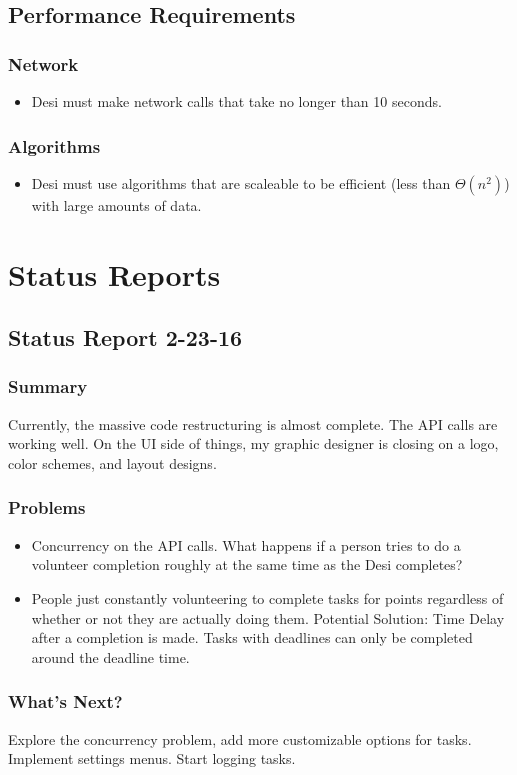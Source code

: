 \documentclass[11pt, a4paper]{report}
\begin{document}
\section{Performance Requirements}
\subsection{Network}
\begin{itemize}
\item Desi must make network calls that take no longer than 10 seconds.
\end{itemize}
\subsection{Algorithms}
\begin{itemize}
\item Desi must use algorithms that are scaleable to be efficient (less than $\Theta(n^2)$) with large amounts of data.
\end{itemize}

\chapter{Status Reports}
\section{Status Report 2-23-16}
\subsection{Summary}
Currently, the massive code restructuring is almost complete. The API calls are working well. On the UI side of things, my graphic designer is closing on a logo, color schemes, and layout designs.
\subsection{Problems}
\begin{itemize}
\item Concurrency on the API calls. What happens if a person tries to do a volunteer completion roughly at the same time as the Desi completes?
\item People just constantly volunteering to complete tasks for points regardless of whether or not they are actually doing them. Potential Solution: Time Delay after a completion is made. Tasks with deadlines can only be completed around the deadline time.
\end{itemize}
\subsection{What's Next?}
Explore the concurrency problem, add more customizable options for tasks. Implement settings menus. Start logging tasks.
\end{document}

